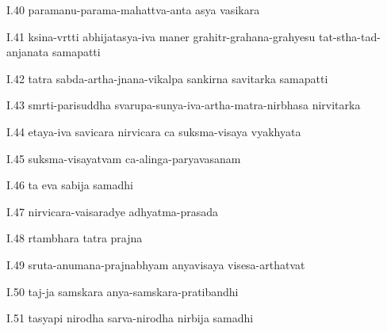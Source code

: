 I.40
paramanu-parama-mahattva-anta asya vasikara

I.41
ksina-vrtti abhijatasya-iva maner
grahitr-grahana-grahyesu tat-stha-tad-anjanata samapatti

I.42
tatra sabda-artha-jnana-vikalpa sankirna savitarka samapatti

I.43
smrti-parisuddha svarupa-sunya-iva-artha-matra-nirbhasa nirvitarka

I.44
etaya-iva savicara nirvicara ca suksma-visaya vyakhyata

I.45
suksma-visayatvam ca-alinga-paryavasanam

I.46
ta eva sabija samadhi

I.47
nirvicara-vaisaradye adhyatma-prasada

I.48
rtambhara tatra prajna

I.49
sruta-anumana-prajnabhyam anyavisaya visesa-arthatvat

I.50
taj-ja samskara anya-samskara-pratibandhi

I.51
tasyapi nirodha sarva-nirodha nirbija samadhi
